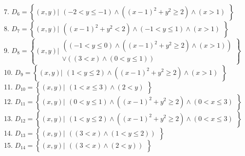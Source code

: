 \documentclass[14pt,a4paper]{scrartcl}
\theoremstyle{definition}
\theoremstyle{remark}
\theoremstyle{definition}
\theoremstyle{definition}
\begin{document}
7. $D_6 = \left\lbrace (x,y) \big| \begin{gathered}
(-2 < y \leq  -1) \land \left( (x-1)^2 + y^2 \geq 2 \right) \land (x > 1)
\end{gathered} \right\rbrace $\\
8. $D_7 = \left\lbrace (x,y) \big| \begin{gathered}
\left( (x-1)^2 + y^2 < 2 \right) \land (-1< y \leq 1 ) \land (x >1)
\end{gathered} \right\rbrace $\\
9. $D_8 = \left\lbrace (x,y) \big| \begin{gathered}
\left( (-1 < y \leq  0) \land \left( (x-1)^2 + y^2 \geq 2 \right) \land (x > 1) \right) \\ \lor
\left( (3 < x ) \land (0 <y \leq 1)  \right)
\end{gathered} \right\rbrace $\\
10. $D_9 = \left\lbrace (x,y) \big| \begin{gathered}
(1 < y \leq  2) \land \left( (x-1)^2 + y^2 \geq 2 \right) \land (x > 1)
\end{gathered} \right\rbrace $\\
11. $D_{10} = \left\lbrace (x,y) \big| \begin{gathered}
( 1 < x \leq 3) \land (2 < y )
\end{gathered} \right\rbrace $\\
12. $D_{11} = \left\lbrace (x,y) \big| \begin{gathered}
(0 < y \leq  1) \land \left( (x-1)^2 + y^2 \geq 2 \right) \land (0 < x \leq 3)
\end{gathered} \right\rbrace $\\
13. $D_{12} = \left\lbrace (x,y) \big| \begin{gathered}
(1 < y \leq  2) \land \left( (x-1)^2 + y^2 \geq 2 \right) \land (0 < x \leq 3)
\end{gathered} \right\rbrace $\\
14. $D_{13} = \left\lbrace (x,y) \big| \begin{gathered}
\left( (3 < x ) \land (1 <y \leq 2)  \right)
\end{gathered} \right\rbrace $\\
15. $D_{14} = \left\lbrace (x,y) \big| \begin{gathered}
\left( (3 < x ) \land (2<y)  \right)
\end{gathered} \right\rbrace $\\

\newpage
\end{document}
